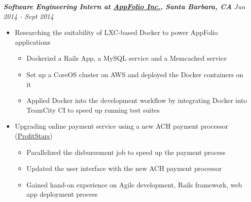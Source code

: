 \documentclass[9pt]{article}
\newenvironment{changemargin}[2]{%
  \begin{list}{}{%
    \setlength{\topsep}{0pt}%
    \setlength{\leftmargin}{#1}%
    \setlength{\rightmargin}{#2}%
    \setlength{\listparindent}{\parindent}%
    \setlength{\itemindent}{\parindent}%
    \setlength{\parsep}{\parskip}%
  }%
  \item[]}{\end{list}
  }
\newenvironment{body} {
  \vspace*{-16pt}
  \begin{changemargin}{-0.25in}{-0.5in}
  }
  {\end{changemargin}
  }
\begin{document}
\begin{body}
  \vspace{14pt}
  \emph{\textbf{Software Engineering Intern at \href{http://www.appfolio.com/}
    {AppFolio Inc.}, Santa Barbara, CA}}
  \hfill\emph{Jun 2014 - Sept 2014}\\
  \vspace*{-2pt}
  \begin{itemize}[leftmargin=0.15in]
    \item
    Researching the suitability of LXC-based Docker to power AppFolio applications
    \vspace*{-2pt}
    \begin{itemize}[leftmargin=0.1in]
      \item
      Dockerizd a Rails App, a MySQL service and a Memcached service
      \item
      Set up a CoreOS cluster on AWS and deployed the Docker containers on it
      \item
      Applied Docker into the development workflow by integrating Docker into
      TeamCity CI to speed up running test suites
    \end{itemize}
    \item
    Upgrading online payment service using a new ACH payment processor
    (\href{http://www.profitstars.com/pages/default.aspx}{ProfitStars})
    \vspace*{-2pt}
    \begin{itemize}[leftmargin=0.1in]
      \item
      Parallelized the disbursement job to speed up the payment process
      \item
      Updated the user interface with the new ACH payment processor
      \item
      Gained hand-on experience on Agile development, Rails framework, web
      app deployment process
    \end{itemize}
  \end{itemize}
  

\end{body}
\end{document}
